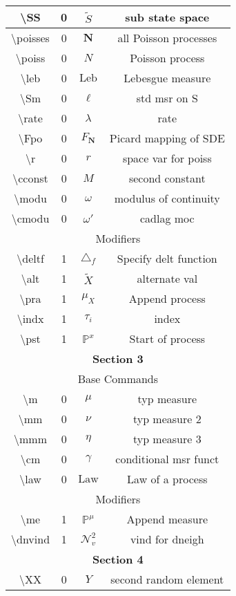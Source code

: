 \documentclass[12pt]{article}
\newcommand{\mb}{\mathbb}
\newcommand{\mc}{\mathcal}
\newcommand{\te}{\text}
\newcommand{\tbs}{\textbackslash}
\newcommand{\pr}{\mb{P}}							%
\renewcommand{\v}{v}							%
\renewcommand{\S}{S}							%
\newcommand{\x}{x}								%
\newcommand{\X}{X}								%
\newcommand{\dneigh}{\mc{N}^2}					%
\renewcommand{\SS}{\tilde{\S}}					%
\newcommand{\poisses}{\mathbf{N}}				%
\newcommand{\poiss}{N}							%
\newcommand{\leb}{\te{Leb}}						%
\newcommand{\Sm}{\ell}							%
\newcommand{\rate}{\lambda}						%
\newcommand{\Fpo}{F_{\poisses}}					%
\renewcommand{\r}{r}							%
\newcommand{\cconst}{M}							%
\newcommand{\modu}{\omega}						%
\newcommand{\cmodu}{\omega'}					%
\newcommand{\deltf}[1]{_{#1}}					%
\newcommand{\alt}[1]{\widetilde{#1}}			%
\newcommand{\pra}[1]{_{#1}}						%
\newcommand{\indx}[1]{_{#1}}					%
\newcommand{\pst}[1]{^{#1}}						%
\newcommand{\m}{\mu}							%
\newcommand{\mm}{\nu}							%
\newcommand{\mmm}{\eta}							%
\newcommand{\cm}{\gamma}						%
\newcommand{\law}{\te{Law}}						%
\newcommand{\me}[1]{^{#1}}						%
\newcommand{\dnvind}[1]{_{#1}}					%
\newcommand{\XX}{Y}								%
\newcommand{\rt}{\tau}							%
\begin{document}
\begin{longtable}{|c|c|c|c|}
\tbs SS & 0 & \(\SS\) & sub state space\\\hline
\tbs poisses & 0 & \(\poisses\) & all Poisson processes\\\hline
\tbs poiss & 0 & \(\poiss\) & Poisson process\\\hline
\tbs leb & 0 & \(\leb\) & Lebesgue measure\\\hline
\tbs Sm & 0 & \(\Sm\) & std msr on \S\\\hline
\tbs rate & 0 & \(\rate\) & rate\\\hline
\tbs Fpo & 0 & \(\Fpo\) & Picard mapping of SDE\\\hline
\tbs r & 0 & \(\r\) & space var for poiss\\\hline
\tbs cconst & 0 & \(\cconst\) & second constant\\\hline
\tbs modu & 0 & \(\modu\) & modulus of continuity\\\hline
\tbs cmodu & 0 & \(\cmodu\) & cadlag moc\\\hline
\multicolumn{4}{|c|}{Modifiers}\\\hline
\tbs deltf & 1 & \(\triangle\deltf{f}\) & Specify delt function\\\hline
\tbs alt & 1 & \(\alt{\X}\) & alternate val\\\hline
\tbs pra & 1 & \(\m\pra{\X}\) & Append process\\\hline
\tbs indx & 1 & \(\rt\indx{i}\) & index\\\hline
\tbs pst & 1 & \(\pr\pst{\x}\) & Start of process\\\hline
\multicolumn{4}{|c|}{\textbf{Section 3}}\\\hline
\multicolumn{4}{|c|}{Base Commands}\\\hline
\tbs m & 0 & \(\m\) & typ measure\\\hline
\tbs mm & 0 & \(\mm\) & typ measure 2\\\hline
\tbs mmm & 0 & \(\mmm\) & typ measure 3\\\hline
\tbs cm & 0 & \(\cm\) & conditional msr funct\\\hline
\tbs law & 0 & \(\law\) & Law of a process\\\hline
\multicolumn{4}{|c|}{Modifiers}\\\hline
\tbs me & 1 & \(\pr\me{\m}\) & Append measure\\\hline
\tbs dnvind & 1 & \(\dneigh\dnvind{\v}\) & vind for dneigh\\\hline
\multicolumn{4}{|c|}{\textbf{Section 4}}\\\hline
\tbs XX & 0 & \(\XX\) & second random element\\\hline

\end{longtable}
\end{document}
